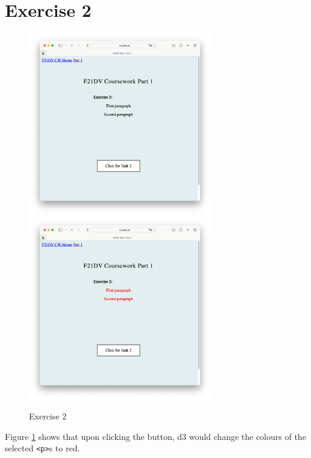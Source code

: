 \documentclass{scrreprt}
\begin{document}
\newpage
\section{Exercise 2}
\begin{figure}[!ht]
    \centering
    \includegraphics[width = 8cm]{images/ex2_1.png}
    \includegraphics[width = 8cm]{images/ex2_2.png}
    \label{fig:ex2}
    \caption{Exercise 2}
\end{figure}
\FloatBarrier
Figure \ref{fig:ex2} shows that upon clicking the button, d3 would change the colours of the selected
\verb|<p>|s to red. 

\newpage
\end{document}
